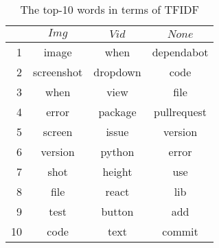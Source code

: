 \begin{table}[t]
  \begin{center}
  \caption{The top-10 words in terms of TFIDF}
  \begin{tabular}{r | c c c}
    \hline
     & $Img$ & $Vid$ & $None$\\
    \hline
    1 & image & when & dependabot\\
    2 & screenshot & dropdown & code\\
    3 & when & view & file\\
    4 & error & package & pullrequest\\
    5 & screen & issue & version\\
    6 & version & python & error\\
    7 & shot & height & use\\
    8 & file & react & lib\\
    9 & test & button & add\\
    10& code & text & commit\\
    \hline
  \end{tabular}\\
  \label{tab:tfidf-result}
  \end{center}
\end{table}
